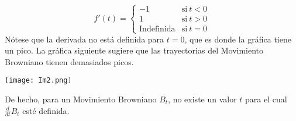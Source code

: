 \documentclass[11pt,notitlepage]{article}
\begin{document}
\begin{equation*}
     f'(t) = \left\{
	       \begin{array}{ll}
		 -1 & \mathrm{si\ } t<0 \\
		  1 & \mathrm{si\ } t>0 \\
		 \mathrm{Indefinida} & \mathrm{si\ } t=0
	       \end{array}
	     \right.
   \end{equation*}
Nótese que la derivada no está definida para \(t=0\), que es donde la gráfica tiene un pico. La gráfica siguiente sugiere que las trayectorias del Movimiento Browniano tienen demasiados picos. 
\begin{center}
    \texttt{[image: Im2.png]}  
\end{center}
De hecho, para un Movimiento Browniano \(B_t\), no existe un valor \(t\) para el cual \(\frac{d}{dt}B_t\) esté definida.\\
\end{document}
